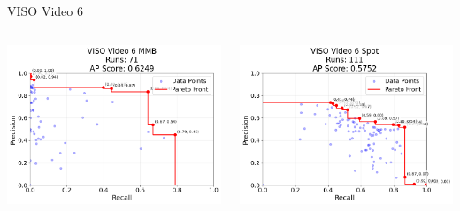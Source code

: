 \begin{frame}{VISO Video 6}
    \begin{columns}
        \begin{column}{0.48\textwidth}
            \centering
            \includegraphics[width=\textwidth,height=0.7\textheight,keepaspectratio]{images/bom/VISO_Video_6_MMB_71.png}
        \end{column}
        \begin{column}{0.48\textwidth}
            \centering
            \includegraphics[width=\textwidth,height=0.7\textheight,keepaspectratio]{images/bom/VISO_Video_6_Spot_111.png}
        \end{column}
    \end{columns}
\end{frame}

